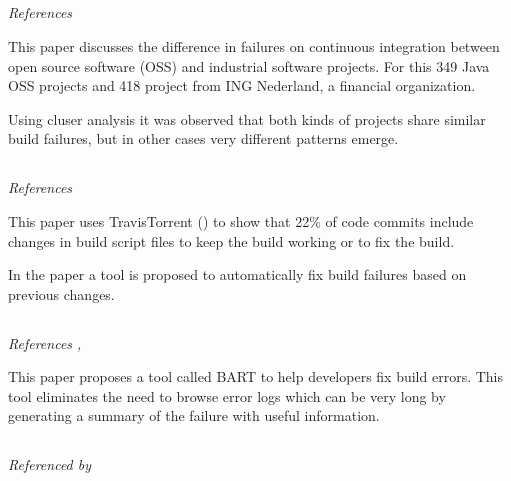 \documentclass[]{book}
\begin{document}
\subsection{\texorpdfstring{\citet{vassallo2017tale}}{@vassallo2017tale}}\label{vassallo2017tale}

\emph{References \citet{beller2017oops} }

This paper discusses the difference in failures on continuous
integration between open source software (OSS) and industrial software
projects. For this 349 Java OSS projects and 418 project from ING
Nederland, a financial organization.

Using cluser analysis it was observed that both kinds of projects share
similar build failures, but in other cases very different patterns
emerge.

\subsection{\texorpdfstring{\citet{hassan2018hirebuild}}{@hassan2018hirebuild}}\label{hassan2018hirebuild}

\emph{References \citet{beller2017travistorrent} }

This paper uses TravisTorrent (\citet{beller2017travistorrent}) to show
that 22\% of code commits include changes in build script files to keep
the build working or to fix the build.

In the paper a tool is proposed to automatically fix build failures
based on previous changes.

\subsection{\texorpdfstring{\citet{vassallo2018break}}{@vassallo2018break}}\label{vassallo2018break}

\emph{References \citet{beller2017oops}, \citet{rausch2017empirical} }

This paper proposes a tool called \textsc{BART} to help developers fix
build errors. This tool eliminates the need to browse error logs which
can be very long by generating a summary of the failure with useful
information.

\subsection{\texorpdfstring{\citet{zampetti2017open}}{@zampetti2017open}}\label{zampetti2017open}

\emph{Referenced by \citet{vassallo2018break} }
\end{document}
